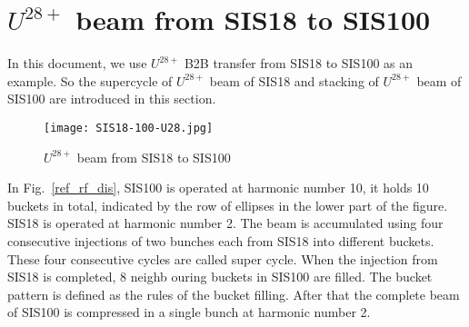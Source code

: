\section{$U^{28+}$ beam from SIS18 to SIS100}

In this document, we use $U^{28+}$ B2B transfer from SIS18 to SIS100 as an example. So the supercycle of $U^{28+}$ beam of SIS18 and stacking of $U^{28+}$ beam of SIS100 are introduced in this section. 
\begin{figure}[!htb]
   \centering   
   \texttt{[image: SIS18-100-U28.jpg]}
   \caption{$U^{28+}$ beam from SIS18 to SIS100}
   \label{SIS18-100-U28}
\end{figure}

In Fig.~\ref{ref_rf_dis}, SIS100 is operated at harmonic number 10, it holds 10 buckets in total, indicated by the row of ellipses in the lower part of the figure. SIS18 is operated at harmonic number 2. The beam is accumulated using four consecutive injections of two bunches each from SIS18 into different buckets. These four consecutive cycles are called super cycle. When the injection from SIS18 is completed, 8 neighb ouring buckets in SIS100 are filled. The bucket pattern is defined as the rules of the bucket filling. After that the complete beam of SIS100 is compressed in a single bunch at harmonic number 2.






